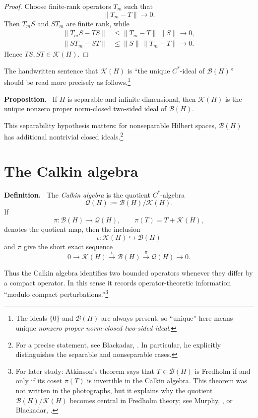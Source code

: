\documentclass[11pt]{article}
\newcommand{\BH}{\mathcal{B}(H)}
\newcommand{\KH}{\mathcal{K}(H)}
\newcommand{\QH}{\mathcal{Q}(H)}
\newenvironment{definition}{\par\medskip\noindent\textbf{Definition.}\ }{\par\medskip}
\newenvironment{proposition}{\par\medskip\noindent\textbf{Proposition.}\ }{\par\medskip}
\begin{document}
\begin{proof}
Choose finite-rank operators $T_m$ such that
\[
\|T_m-T\|\longrightarrow0.
\]
Then $T_mS$ and $ST_m$ are finite rank, while
\begin{align*}
\|T_mS-TS\|
 &\le \|T_m-T\|\,\|S\|\longrightarrow0,\\
\|ST_m-ST\|
 &\le \|S\|\,\|T_m-T\|\longrightarrow0.
\end{align*}
Hence $TS,ST\in\KH$.
\end{proof}

The handwritten sentence that $\KH$ is ``the unique $C^*$-ideal of $\BH$'' should be
read more precisely as follows.\footnote{The ideals $\{0\}$ and $\BH$ are always present,
so ``unique'' here means unique \emph{nonzero proper norm-closed two-sided ideal}.}

\begin{proposition}
If $H$ is separable and infinite-dimensional, then $\KH$ is the unique nonzero proper
norm-closed two-sided ideal of $\BH$.
\end{proposition}

This separability hypothesis matters: for nonseparable Hilbert spaces, $\BH$ has
additional nontrivial closed ideals.\footnote{For a precise statement, see Blackadar,
\cite[\S I.8.7]{Blackadar2006}.  In particular, he explicitly distinguishes the
separable and nonseparable cases.}

\section{The Calkin algebra}

\begin{definition}
The \emph{Calkin algebra} is the quotient $C^*$-algebra
\[
\boxed{
\QH:=\BH/\KH.
}
\]
If
\[
\pi:\BH\longrightarrow\QH,
\qquad
\pi(T)=T+\KH,
\]
denotes the quotient map, then the inclusion
\[
\iota:\KH\hookrightarrow\BH
\]
and $\pi$ give the short exact sequence
\[
\boxed{
0\longrightarrow\KH
\xrightarrow{\ \iota\ }
\BH
\xrightarrow{\ \pi\ }
\QH
\longrightarrow0.
}
\]
\end{definition}

Thus the Calkin algebra identifies two bounded operators whenever they differ by a
compact operator.  In this sense it records operator-theoretic information ``modulo
compact perturbations.''\footnote{For later study: Atkinson's theorem says that
$T\in\BH$ is Fredholm if and only if its coset $\pi(T)$ is invertible in the Calkin
algebra.  This theorem was not written in the photographs, but it explains why the
quotient $\BH/\KH$ becomes central in Fredholm theory; see Murphy,
\cite[\S 1.4]{Murphy1990}, or Blackadar, \cite[Chapter I]{Blackadar2006}.}
\end{document}
